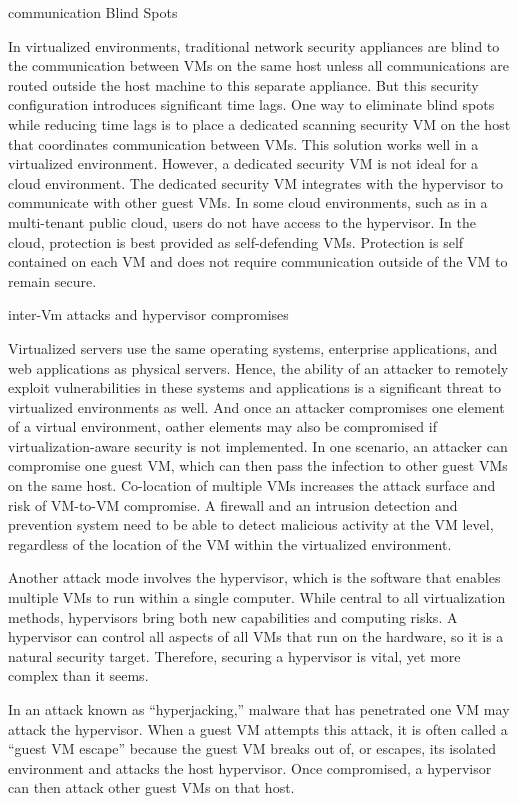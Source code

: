 communication Blind Spots

In virtualized environments, traditional network security appliances are blind to the communication between VMs on the same host unless all communications are routed outside the host machine to this separate appliance. But this security configuration introduces significant time lags. One way to eliminate blind spots while reducing time lags is to place a dedicated scanning security VM on the host that coordinates communication between VMs. This solution works well in a virtualized environment. However, a dedicated security VM is not ideal for a cloud environment. The dedicated security VM integrates with the hypervisor to communicate with other guest VMs. In some cloud environments, such as in a multi-tenant public cloud, users do not have access to the hypervisor. In the cloud, protection is best provided as self-defending VMs. Protection is self contained on each VM and does not require communication outside of the VM to remain secure.

inter-Vm attacks and hypervisor compromises

Virtualized servers use the same operating systems, enterprise applications, and web applications as physical servers. Hence, the ability of an attacker to remotely exploit vulnerabilities in these systems and applications is a significant threat to virtualized environments as well. And once an attacker compromises one element of a virtual environment, oather elements may also be compromised if virtualization-aware security is not implemented.
In one scenario, an attacker can compromise one guest VM, which can then pass
the infection to other guest VMs on the same host. Co-location of multiple VMs
increases the attack surface and risk of VM-to-VM compromise. A firewall and an intrusion detection and prevention system need to be able to detect malicious activity at the VM level, regardless of the location of the VM within the virtualized environment.

Another attack mode involves the hypervisor, which is the software that enables multiple VMs to run within a single computer. While central to all virtualization methods, hypervisors bring both new capabilities and computing risks. A hypervisor can control all aspects of all VMs that run on the hardware, so it is a natural security target. Therefore, securing a hypervisor is vital, yet more complex than it seems.

In an attack known as “hyperjacking,” malware that has penetrated one VM may attack the hypervisor. When a guest VM attempts this attack, it is often called a “guest VM escape” because the guest VM breaks out of, or escapes, its isolated environment and attacks the host hypervisor. Once compromised, a hypervisor can then attack other guest VMs on that host.

